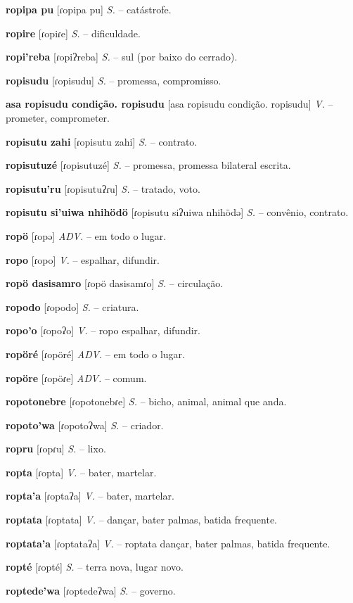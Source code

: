 \textbf{ropipa pu} [ɾopipa pu] \textit{S.} -- catástrofe.

\textbf{ropire} [ɾopiɾe] \textit{S.} -- dificuldade.

\textbf{ropi'reba} [ɾopiʔreba] \textit{S.} -- sul (por baixo do cerrado).

\textbf{ropisudu} [ɾopisudu] \textit{S.} -- promessa, compromisso.

\textbf{asa ropisudu condição. ropisudu} [asa ropisudu condição. ropisudu] \textit{V.} -- prometer, comprometer.

\textbf{ropisutu zahi} [ɾopisutu zahi] \textit{S.} -- contrato.

\textbf{ropisutuzé} [ɾopisutuzé] \textit{S.} -- promessa, promessa bilateral escrita.

\textbf{ropisutu'ru} [ɾopisutuʔɾu] \textit{S.} -- tratado, voto.

\textbf{ropisutu si'uiwa nhihödö} [ɾopisutu siʔuiwa nhihödə] \textit{S.} -- convênio, contrato.

\textbf{ropö} [ɾopə] \textit{ADV.} -- em todo o lugar.

\textbf{ropo} [ɾopo] \textit{V.} -- espalhar, difundir.

\textbf{ropö dasisamro} [ɾopö dasisamɾo] \textit{S.} -- circulação.

\textbf{ropodo} [ɾopodo] \textit{S.} -- criatura.

\textbf{ropo'o} [ɾopoʔo] \textit{V.} -- ropo espalhar, difundir.

\textbf{ropöré} [ɾopöré] \textit{ADV.} -- em todo o lugar.

\textbf{ropöre} [ɾopöɾe] \textit{ADV.} -- comum.

\textbf{ropotonebre} [ɾopotonebɾe] \textit{S.} -- bicho, animal, animal que anda.

\textbf{ropoto'wa} [ɾopotoʔwa] \textit{S.} -- criador.

\textbf{ropru} [ɾopɾu] \textit{S.} -- lixo.

\textbf{ropta} [ɾopta] \textit{V.} -- bater, martelar.

\textbf{ropta'a} [ɾoptaʔa] \textit{V.} -- bater, martelar.

\textbf{roptata} [ɾoptata] \textit{V.} -- dançar, bater palmas, batida frequente.

\textbf{roptata'a} [ɾoptataʔa] \textit{V.} -- roptata dançar, bater palmas, batida frequente.

\textbf{ropté} [ɾopté] \textit{S.} -- terra nova, lugar novo.

\textbf{roptede'wa} [ɾoptedeʔwa] \textit{S.} -- governo.

